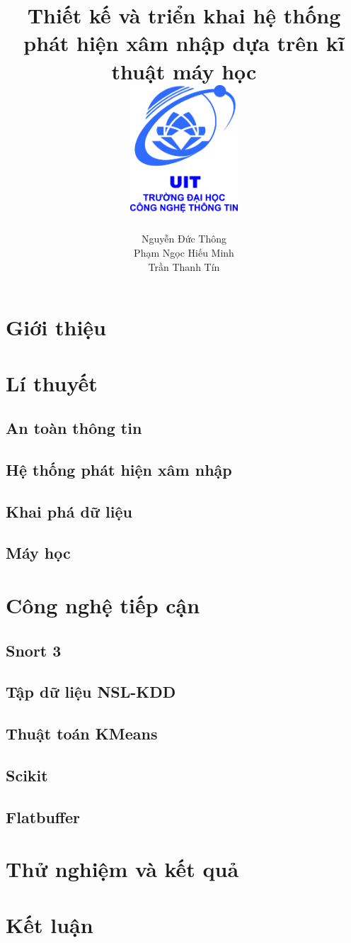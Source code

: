 \documentclass[12pt,twoside]{report}
\title{
    {Thiết kế và triển khai hệ thống phát hiện xâm nhập dựa trên kĩ thuật máy học}\\
    {\includegraphics[width=4cm]{logo}}
}
\author{
    Nguyễn Đức Thông
    \\
    Phạm Ngọc Hiếu Minh
    \\
    Trần Thanh Tín
}
\begin{document}
\maketitle
\newpage
\tableofcontents
\listoffigures
\newpage

    \chapter{Giới thiệu}
    
    \newpage
    \chapter{Lí thuyết}
    \section{An toàn thông tin}
    
    \section{Hệ thống phát hiện xâm nhập}
    
    \section{Khai phá dữ liệu}
    
    \section{Máy học}
    
    \newpage
    \chapter{Công nghệ tiếp cận}
    \section{Snort 3}
    
    \section{Tập dữ liệu NSL-KDD}
    
    \section{Thuật toán KMeans}
    
    \section{Scikit}
    
    \section{Flatbuffer}
    
    \newpage
    \chapter{Thử nghiệm và kết quả}
    
    \newpage
    \chapter{Kết luận}
    

\newpage


\end{document}
